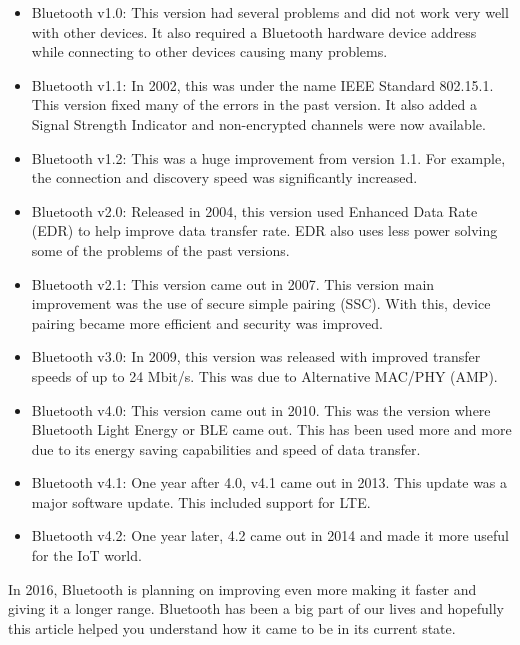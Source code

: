 \documentclass[11pt,a4paper]{article}
\begin{document}
{\begin{itemize}
\item Bluetooth v1.0: This version had several problems and did not work very well with other devices. It also required a Bluetooth hardware device address while connecting to other devices causing many problems.

\item Bluetooth v1.1: In 2002, this was under the name IEEE Standard 802.15.1. This version fixed many of the errors in the past version. It also added a Signal Strength Indicator and non-encrypted channels were now available.

\item Bluetooth v1.2: This was a huge improvement from version 1.1. For example, the connection and discovery speed was significantly increased.

\item Bluetooth v2.0: Released in 2004, this version used Enhanced Data Rate (EDR) to help improve data transfer rate. EDR also uses less power solving some of the problems of the past versions.

\item Bluetooth v2.1: This version came out in 2007. This version main improvement was the use of secure simple pairing (SSC). With this, device pairing became more efficient and security was improved.

\item Bluetooth v3.0: In 2009, this version was released with improved transfer speeds of up to 24 Mbit/s. This was due to Alternative MAC/PHY (AMP).

\item Bluetooth v4.0: This version came out in 2010. This was the version where Bluetooth Light Energy or BLE came out. This has been used more and more due to its energy saving capabilities and speed of data transfer.

\item Bluetooth v4.1: One year after 4.0, v4.1 came out in 2013. This update was a major software update. This included support for LTE.

\item Bluetooth v4.2: One year later, 4.2 came out in 2014 and made it more useful for the IoT world.

\end{itemize}
In 2016, Bluetooth is planning on improving even more making it faster and giving it a longer range. Bluetooth has been a big part of our lives and hopefully this article helped you understand how it came to be in its current state.
}
\end{document}
